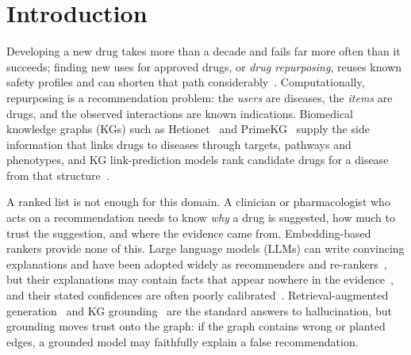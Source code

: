 \documentclass[electronics,article,submit]{Definitions/mdpi}
\begin{document}
\section{Introduction}
Developing a new drug takes more than a decade and fails far more often than it succeeds; finding new uses for approved drugs, or \emph{drug repurposing}, reuses known safety profiles and can shorten that path considerably~\cite{pushpakom2019}. Computationally, repurposing is a recommendation problem: the \emph{users} are diseases, the \emph{items} are drugs, and the observed interactions are known indications. Biomedical knowledge graphs (KGs) such as Hetionet~\cite{himmelstein2017hetionet} and PrimeKG~\cite{chandak2023primekg} supply the side information that links drugs to diseases through targets, pathways and phenotypes, and KG link-prediction models rank candidate drugs for a disease from that structure~\cite{bordes2013transe,sun2019rotate,huang2024txgnn}.

A ranked list is not enough for this domain. A clinician or pharmacologist who acts on a recommendation needs to know \emph{why} a drug is suggested, how much to trust the suggestion, and where the evidence came from. Embedding-based rankers provide none of this. Large language models (LLMs) can write convincing explanations and have been adopted widely as recommenders and re-rankers~\cite{wu2024llmrec}, but their explanations may contain facts that appear nowhere in the evidence~\cite{ji2023hallucination}, and their stated confidences are often poorly calibrated~\cite{kadavath2022know,xiong2024uncertainty}. Retrieval-augmented generation~\cite{lewis2020rag} and KG grounding~\cite{pan2024unifying} are the standard answers to hallucination, but grounding moves trust onto the graph: if the graph contains wrong or planted edges, a grounded model may faithfully explain a false recommendation.
\end{document}
